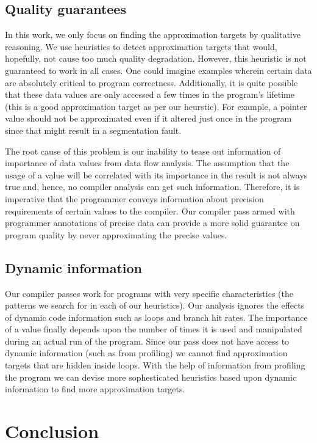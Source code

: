 \documentclass[12pt,conference]{IEEEtran}
\begin{document}
\subsection{Quality guarantees}

In this work, we only focus on finding the approximation targets by
qualitative reasoning. We use heuristics to detect approximation targets that 
would, hopefully, not cause too much quality degradation. However, this heuristic
is not guaranteed to work in all cases. One could imagine examples wherein certain
data are absolutely critical to program correctness. Additionally, it is quite possible
that these data values are only accessed a few times in the program's lifetime (this
is a good approximation target as per our heurstic). For example, a pointer value 
should not be approximated even if it altered just once in the program since that
might result in a segmentation fault. 

The root cause of this problem is our inability to tease out information of 
importance of data values from data flow analysis. The assumption that
the usage of a value will be correlated with its importance in the result
is not always true and, hence, no compiler analysis can get such information. 
Therefore, it is imperative that the programmer conveys information about 
precision requirements of certain values to the compiler\cite{approx}\cite{enerJ}\cite{rely}.
Our compiler pass armed with programmer annotations of precise data can provide a 
more solid guarantee on program quality by never approximating the precise values.

\subsection{Dynamic information}

Our compiler passes work for programs with very specific characteristics (the patterns
we search for in each of our heuristics). Our analysis ignores the effects of 
dynamic code information such as loops and branch hit rates. The importance of 
a value finally depends upon the number of times it is used and manipulated 
during an actual run of the program. Since our pass does not have access to 
dynamic information (such as from profiling) we cannot find approximation targets that
are hidden inside loops. With the help of information from profiling the program 
we can devise more sophesticated heuristics based upon dynamic information to 
find more approximation targets.
 

\section{Conclusion}\label{sec:conclusion}
\end{document}
